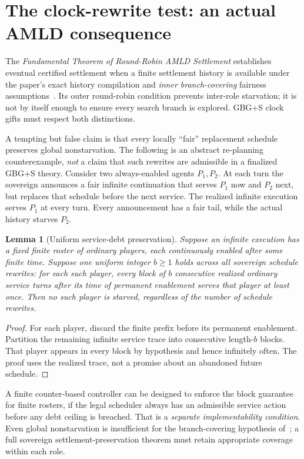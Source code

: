 \documentclass[11pt,letterpaper]{article}
\newtheorem{lemma}[definition]{Lemma}
\theoremstyle{remark}
\begin{document}
\section{The clock-rewrite test: an actual AMLD consequence}
The \emph{Fundamental Theorem of Round-Robin AMLD Settlement} establishes eventual certified settlement when a finite settlement history is available under the paper's exact history compilation and \emph{inner branch-covering} fairness assumptions~\cite{RoundRobin}. Its outer round-robin condition prevents inter-role starvation; it is not by itself enough to ensure every search branch is explored. GBG+S clock gifts must respect both distinctions.

A tempting but false claim is that every locally ``fair'' replacement schedule preserves global nonstarvation. The following is an abstract re-planning counterexample, \emph{not} a claim that such rewrites are admissible in a finalized GBG+S theory. Consider two always-enabled agents $P_1,P_2$. At each turn the sovereign announces a fair infinite continuation that serves $P_1$ now and $P_2$ next, but replaces that schedule before the next service. The realized infinite execution serves $P_1$ at every turn. Every announcement has a fair tail, while the actual history starves $P_2$.

\begin{lemma}[Uniform service-debt preservation]\label{lem:debt}
Suppose an infinite execution has a fixed finite roster of ordinary players, each continuously enabled after some finite time. Suppose one uniform integer $b\ge 1$ holds across \emph{all} sovereign schedule rewrites: for each such player, every block of $b$ consecutive \emph{realized} ordinary service turns after its time of permanent enablement serves that player at least once. Then no such player is starved, regardless of the number of schedule rewrites.
\end{lemma}
\begin{proof}
For each player, discard the finite prefix before its permanent enablement. Partition the remaining infinite service trace into consecutive length-$b$ blocks. That player appears in every block by hypothesis and hence infinitely often. The proof uses the realized trace, not a promise about an abandoned future schedule.\end{proof}

A finite counter-based controller can be designed to enforce the block guarantee for finite rosters, if the legal scheduler always has an admissible service action before any debt ceiling is breached. That is a \emph{separate implementability condition}. Even global nonstarvation is insufficient for the branch-covering hypothesis of~\cite{RoundRobin}; a full sovereign settlement-preservation theorem must retain appropriate coverage within each role.
\end{document}
